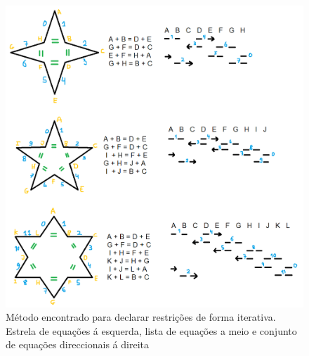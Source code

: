 \begin{figure}[h]
\centering
\includegraphics[width=\textwidth]{figuras/dimensional_search.png}
\caption{Método encontrado para declarar restrições de forma iterativa. Estrela de equações á esquerda, lista de equações a meio e conjunto de equações direccionais á direita}
\label{fig: restriction_method}
\end{figure}
